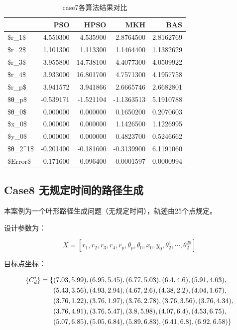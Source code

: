 \documentclass[]{ctexbook}
\theoremstyle{definition}
\theoremstyle{definition}
\theoremstyle{definition}
\theoremstyle{remark}
\begin{document}
\begin{table}

\caption{\label{tab:case7table}case7各算法结果对比}
\centering
\begin{tabular}[t]{lrrrr}
\toprule
  & PSO & HPSO & MKH & BAS\\
\midrule
\$r\_1\$ & 4.550300 & 4.535900 & 2.8764500 & 2.8162769\\
\$r\_2\$ & 1.101300 & 1.113300 & 1.1464400 & 1.1382629\\
\$r\_3\$ & 3.955800 & 14.738100 & 4.4077300 & 4.0509922\\
\$r\_4\$ & 3.933000 & 16.801700 & 4.7571300 & 4.1957758\\
\$r\_p\$ & 3.941572 & 3.941866 & 2.6665746 & 2.6682801\\
\addlinespace
\$θ\_p\$ & -0.539171 & -1.521104 & -1.1363513 & 5.1910788\\
\$θ\_0\$ & 0.000000 & 0.000000 & 0.1650200 & 0.2070603\\
\$x\_0\$ & 0.000000 & 0.000000 & 1.1426500 & 1.1226995\\
\$y\_0\$ & 0.000000 & 0.000000 & 0.4823700 & 0.5246662\\
\$θ\_2\textasciicircum{}1\$ & -0.201400 & -0.181600 & -0.3139900 & 6.1191060\\
\$Error\$ & 0.171600 & 0.096400 & 0.0001597 & 0.0000994\\
\bottomrule
\end{tabular}
\end{table}

\subsection{Case8 无规定时间的路径生成}\label{case8-}

本案例为一个叶形路径生成问题（无规定时间），轨迹由25个点规定。

设计参数为：

\[
X = [r_1,r_2,r_3,r_4,r_p,\theta_p,\theta_0,x_0,y_0,\theta_2^1,\cdots,\theta_2^{25}]
\]

目标点坐标：

\begin{align}
\{C_d^i\} = \{&(7.03,5.99),(6.95,5.45),(6.77,5.03),(6.4,4.6),(5.91,4.03), \notag \\
&(5.43,3.56),(4.93,2.94),(4.67,2.6),(4.38,2.2),(4.04,1.67),\notag \\
&(3.76,1.22),(3.76,1.97),(3.76,2.78),(3.76,3.56),(3.76,4.34), \notag \\
&(3.76,4.91),(3.76,5.47),(3.8,5.98),(4.07,6.4),(4.53,6.75), \notag \\
&(5.07,6.85),(5.05,6.84),(5.89,6.83),(6.41,6.8),(6.92,6.58)\} \notag \\
\end{align}
\end{document}
